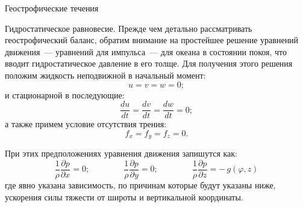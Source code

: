 \begin{chapter}{Геострофические течения}
\begin{section}{Гидростатическое равновесие.}
Прежде чем детально рассматривать геострофический баланс, обратим
внимание на простейшее решение уравнений движения~--- уравнений для
импульса~--- для океана в состоянии покоя, что вводит гидростатическое
давление в его толще. Для получения этого решения положим жидкость
неподвижной в начальный момент:
\begin{equation}
  u = v = w = 0;
\end{equation}
и стационарной в последующие:
\begin{equation}
 \frac{du}{dt}=\frac{dv}{dt}=\frac{dw}{dt} = 0;
\end{equation}
а также примем условие отсутствия трения:
\begin{equation}
 f_x = f_y =f_z = 0.
\end{equation}
%

При этих предположениях уравнения движения запишутся как:
\begin{equation}
\frac{1}{\rho}\frac{\partial p}{\partial x}=0; \qquad \qquad
\frac{1}{\rho}\frac{\partial p}{\partial y}=0; \qquad \qquad
\frac{1}{\rho}\frac{\partial p}{\partial z}=-\,g(\varphi,z)
\end{equation}
где явно указана зависимость, по причинам которые будут указаны ниже,
ускорения силы тяжести от широты и вертикальной координаты.
%


\end{section}
\end{chapter}
